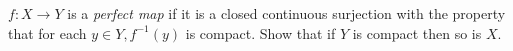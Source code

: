 $f:X\rightarrow Y$ is a \emph{perfect map} if it is a closed
continuous surjection with the property that for each $y\in Y,
f^{-1}(y)$ is compact. Show that if $Y$ is compact then so is $X$.
